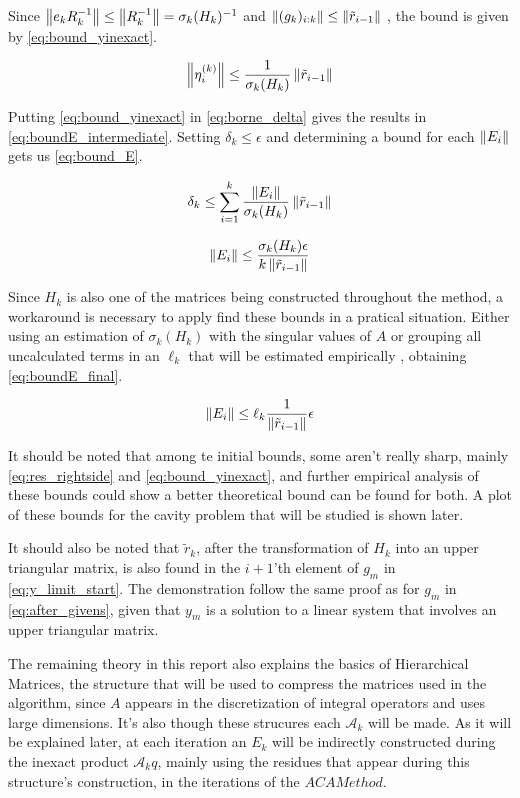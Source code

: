 Since $\left\lVert e_{k}R^{-1}_{k}\right\rVert \leq \left\lVert R^{-1}_{k}\right\rVert = \sigma_{k}(H_{k})^{-1}$ and $\left\lVert(g_{k})_{i:k}\right\rVert \leq \left\lVert\tilde{r}_{i-1}\right\rVert$ \cite{simoncini2003theory}, the bound is given by \ref{eq:bound_yinexact}.

\begin{equation}\label{eq:bound_yinexact}
    \left\lVert\eta_{i}^{(k)}\right\rVert \leq \frac{1}{\sigma_{k}(H_{k})} \left\lVert\tilde{r}_{i-1}\right\rVert
\end{equation}

Putting \ref{eq:bound_yinexact} in \ref{eq:borne_delta} gives the results in \ref{eq:boundE_intermediate}. Setting $\delta_{k} \leq \epsilon$ and determining a bound for each $\left\lVert E_{i}\right\rVert$ gets us \ref{eq:bound_E}.


\begin{equation}\label{eq:boundE_intermediate}
    \delta_{k} \leq \sum_{i=1}^{k} \frac{\left\lVert E_{i}\right\rVert}{\sigma_{k}(H_{k})}\left\lVert\tilde{r}_{i-1}\right\rVert
\end{equation}

\begin{equation}\label{eq:bound_E}
    \left\lVert E_{i}\right\rVert \leq \frac{\sigma_{k}(H_{k})\epsilon}{k\left\lVert\tilde{r}_{i-1}\right\rVert}
\end{equation}

Since $H_{k}$ is also one of the matrices being constructed throughout the method, a workaround is necessary to apply find these bounds in a pratical situation. Either using an estimation of $\sigma_{k}(H_{k})$ with the singular values of $A$ or grouping all uncalculated terms in an $\ell_{k}$ that will be estimated empirically \cite{simoncini2003theory}, obtaining \ref{eq:boundE_final}.

\begin{equation}\label{eq:boundE_final}
    \left\lVert E_{i}\right\rVert \leq \ell_{k} \frac{1}{\left\lVert\tilde{r}_{i-1}\right\rVert} \epsilon
\end{equation}

It should be noted \cite{simoncini2003theory} that among te initial bounds, some aren't really sharp, mainly \ref{eq:res_rightside} and \ref{eq:bound_yinexact}, and further empirical analysis of these bounds could show a better theoretical bound can be found for both. A plot of these bounds for the cavity problem that will be studied is shown later.

It should also be noted that $\tilde{r}_{k}$, after the transformation of $H_{k}$ into an upper triangular matrix, is also found in the $i+1$'th element of $g_{m}$ in \ref{eq:y_limit_start}. The demonstration follow the same proof as for $g_{m}$ in \ref{eq:after_givens}, given that $y_{m}$ is a solution to a linear system that involves an upper triangular matrix.

The remaining theory in this report also explains the basics of Hierarchical Matrices, the structure that will be used to compress the matrices used in the algorithm, since $A$ appears in the discretization of integral operators and uses large dimensions.
It's also though these strucures each $\mathcal{A}_{k}$ will be made. As it will be explained later, at each iteration an $E_{k}$ will be indirectly constructed during the inexact product $\mathcal{A}_{k}q$, mainly using the residues that appear during this structure's construction, in the iterations of the $ACA Method$.